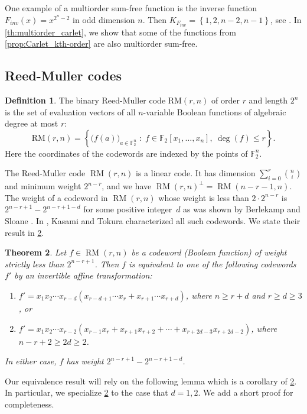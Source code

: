\documentclass[12pt]{article}
\newtheorem{thm}{Theorem}[section]
\theoremstyle{definition}
\newtheorem{defn}[thm]{Definition}
\newcommand{\set}[1]{\left\{#1\right\}}
\DeclareMathOperator{\RM}{RM}
\begin{document}
One example of a multiorder sum-free function is the inverse function $F_{inv}(x) = x^{2^n-2}$ in odd dimension $n$. Then $K_{F_{inv}} = \set{1, 2,n-2,n-1}$, see \cite{carlet2025inverse}. In \cref{th:multiorder_carlet}, we show that some of the functions from \cref{prop:Carlet_kth-order} are also multiorder sum-free.

\subsection{Reed-Muller codes}
\label{subsec:reed-muller}

\begin{defn} 
The binary Reed-Muller code $\mathrm{RM}(r,n)$ of order $r$ and length $2^n$ is the set of evaluation vectors of all $n$-variable Boolean functions of algebraic degree at most $r$:
\[
\mathrm{RM}(r,n)
=
\left\{
\bigl(f(a)\bigr)_{a \in \mathbb{F}_2^n}
\;:\;
f \in \mathbb{F}_2[x_1,\dots,x_n],\ \deg(f)\le r
\right\}.
\]
Here the coordinates of the codewords are indexed by the points of $\mathbb{F}_2^n$.
\end{defn}
The Reed-Muller code $\RM(r,n)$ is a linear code. It has dimension $\sum_{i=0}^r \binom{n}{i}$ and minimum weight $2^{n-r}$, and we have $\RM(r,n)^\perp = \RM(n-r-1,n)$. The weight of a codeword in $\RM(r,n)$ whose weight is less than $2\cdot 2^{n-r}$ is  $2^{n-r+1} - 2^{n - r + 1 - d}$ for some positive integer~$d$ as was shown by Berlekamp and Sloane \cite{1970Berlekamp}. In \cite{kasami1970}, Kasami and Tokura characterized all such codewords. We state their result in \cref{T: min-weights}.


\begin{thm}\label{T: min-weights}
    Let $f \in \RM(r, n)$ be a codeword (Boolean function) of weight strictly less than $2^{n-r+1}$. Then $f$ is equivalent to one of the following codewords $f'$ by an invertible affine transformation:
    \begin{enumerate}
        \item  $f' = x_1x_2\cdots x_{r-d}(x_{r-d+1}\cdots x_r + x_{r+1}\cdots x_{r+d})$,
        where $n \geq r + d$ and $r \geq d \geq 3$, or
        \item $f' = x_1x_2\cdots x_{r-2}(x_{r-1}x_{r} + x_{r+1}x_{r+2} + \cdots + x_{r+2d -3}x_{r+2d - 2})$, where $n - r + 2 \geq 2d \geq 2$.
    \end{enumerate}
    In either case, $f$ has weight $2^{n-r+1}-2^{n-r+1-d}$.
\end{thm}

Our equivalence result will rely on the following lemma which is a corollary of \cref{T: min-weights}. In particular, we specialize \cref{T: min-weights} to the case that $d = 1, 2$. We add a short proof for completeness.
\end{document}
